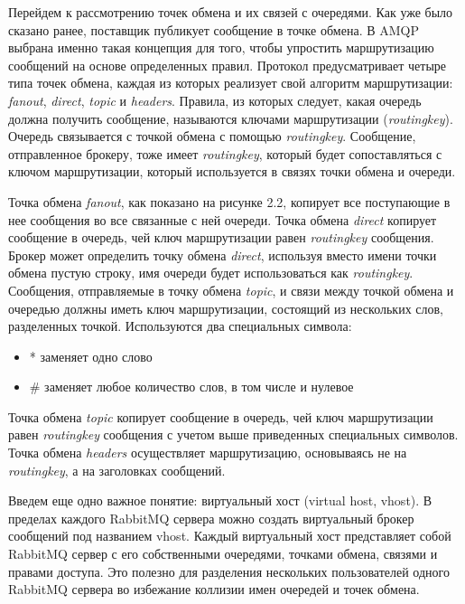 Перейдем к рассмотрению точек обмена и их связей с очередями. Как уже было сказано ранее, поставщик публикует сообщение в точке обмена. В AMQP выбрана именно такая концепция для того, чтобы упростить маршрутизацию сообщений на основе определенных правил. Протокол предусматривает четыре типа точек обмена, каждая из которых реализует свой алгоритм маршрутизации: \textit{fanout}, \textit{direct}, \textit{topic} и \textit{headers}. Правила, из которых следует, какая очередь должна получить сообщение, называются ключами маршрутизации (\textit{routing\underline{\hspace{0.25cm}}key}). Очередь связывается с точкой обмена с помощью \textit{routing\underline{\hspace{0.25cm}}key}. Сообщение, отправленное брокеру, тоже имеет  \textit{routing\underline{\hspace{0.25cm}}key}, который будет сопоставляться с ключом маршрутизации, который используется в связях точки обмена и очереди.

Точка обмена \textit{fanout}, как показано на рисунке 2.2, копирует все поступающие в нее сообщения во все связанные с ней очереди. Точка обмена \textit{direct} копирует сообщение в очередь, чей ключ маршрутизации равен \textit{routing\underline{\hspace{0.25cm}}key} сообщения. Брокер может определить точку обмена \textit{direct}, используя вместо имени точки обмена пустую строку, имя очереди будет использоваться как \textit{routing\underline{\hspace{0.25cm}}key}. Сообщения, отправляемые в точку обмена \textit{topic}, и связи между точкой обмена и очередью должны иметь ключ маршрутизации, состоящий из нескольких слов, разделенных точкой. Используются два специальных символа:
\begin{itemize}
\item * заменяет одно слово
\item \# заменяет любое количество слов, в том числе и нулевое
\end{itemize}
Точка обмена \textit{topic} копирует сообщение в очередь, чей ключ маршрутизации равен \textit{routing\underline{\hspace{0.25cm}}key} сообщения с учетом выше приведенных специальных символов. Точка обмена \textit{headers} осуществляет маршрутизацию, основываясь не на \textit{routing\underline{\hspace{0.25cm}}key}, а на заголовках сообщений.

Введем еще одно важное понятие: виртуальный хост (virtual host, vhost). В пределах каждого RabbitMQ сервера можно создать виртуальный брокер сообщений под названием vhost. Каждый виртуальный хост представляет собой RabbitMQ сервер с его собственными очередями, точками обмена, связями и правами доступа. Это полезно для разделения нескольких пользователей одного RabbitMQ сервера во избежание коллизии имен очередей и точек обмена. 

